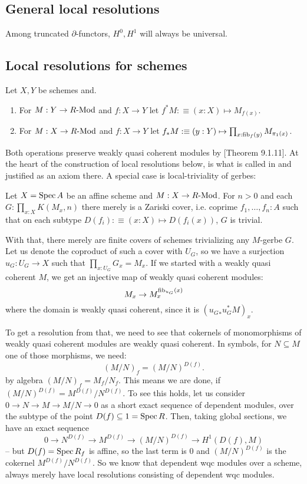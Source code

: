 
\subsection{General local resolutions}

Among truncated $\partial$-functors, $H^0, H^1$ will always be universal.

\subsection{Local resolutions for schemes}

\begin{definition}
  Let $X,Y$ be schemes and.
  \begin{enumerate}
  \item For $M:Y\to R\text{-}\mathrm{Mod}$ and $f:X\to Y$ let $f^*M:\equiv (x:X)\mapsto M_{f(x)}$.
  \item For $M:X\to R\text{-}\mathrm{Mod}$ and $f:X\to Y$ let $f_*M:\equiv (y:Y)\mapsto \prod_{x:\mathrm{fib}_f(y)}M_{\pi_1(x)}$.
  \end{enumerate}
\end{definition}

Both operations preserve weakly quasi coherent modules by \cite{draft}[Theorem 9.1.11].
At the heart of the construction of local resolutions below,
is what is called  in \cite{draft} and justified as an axiom there.
A special case is local-triviality of gerbes:

\begin{axiom}
  Let $X=\operatorname{Spec} A$ be an affine scheme and $M:X\to R\text{-}\mathrm{Mod}$.
  For $n>0$ and each $G:\prod_{x:X}K(M_x,n)$ there merely is a Zariski cover,
  i.e. coprime
  $f_1,\dots,f_n:A$ such that on each subtype $D(f_i):\equiv (x:X)\mapsto D(f_i(x))$,
  $G$ is trivial.
\end{axiom}

With that, there merely are finite covers of schemes trivializing any $M$-gerbe $G$.
Let us denote the coproduct of such a cover with $U_G$,
so we have a surjection $u_G:U_G\to X$ such that $\prod_{x:U_G}G_x=M_x$.
If we started with a weakly quasi coherent $M$,
we get an injective map of weakly quasi coherent modules:
\[
  M_x \to M_x^{\mathrm{fib}_{u_G}(x)}
\]
where the domain is weakly quasi coherent, since it is $({u_G}_*u_G^*M)_x$.

To get a resolution from that, we need to see that cokernels of monomorphisms
of weakly quasi coherent modules are weakly quasi coherent.
In symbols, for $N\subseteq M$ one of those morphisms, we need:
\[
  (M/N)_f=(M/N)^{D(f)}.
\]
by algebra $(M/N)_f=M_f/N_f$.
This means we are done, if $(M/N)^{D(f)}=M^{D(f)}/{N^{D(f)}}$.
To see this holds, let us consider $0\to N\to M\to M/N\to 0$ as a short exact sequence of dependent modules,
over the subtype of the point $D(f)\subseteq 1=\operatorname{Spec} R$.
Then, taking global sections, we have an exact sequence
\[
 0\to N^{D(f)}\to M^{D(f)}\to (M/N)^{D(f)}\to H^1(D(f),M)
\]
-- but $D(f)=\operatorname{Spec} R_f$ is affine,
so the last term is 0 and $(M/N)^{D(f)}$ is the cokernel $M^{D(f)}/N^{D(f)}$.
So we know that dependent wqc modules over a scheme,
always merely have local resolutions consisting of dependent wqc modules.

